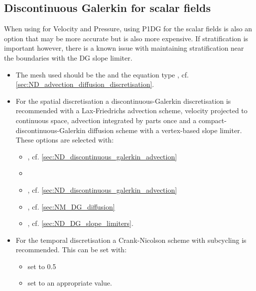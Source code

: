 \subsection{Discontinuous Galerkin for scalar fields}
When using \PoDGPt for Velocity and Pressure, using P1DG for the scalar fields
is also an option that may be more accurate but is also more expensive. If stratification is important however, there is a known
issue with maintaining stratification near the boundaries with the DG slope
limiter.
\begin{itemize}
  \item The mesh used should be the  and the equation type , cf. \ref{sec:ND_advection_diffusion_discretisation}. 
  \item For the spatial discretisation a discontinuous-Galerkin discretisation
is recommended with a Lax-Friedrichs advection scheme, velocity
projected to continuous space, advection integrated by parts once and
a compact-discontinuous-Galerkin diffusion scheme with a vertex-based
slope limiter. These options are selected with:
\begin{itemize}
\item{, cf. \ref{sec:ND_discontinuous_galerkin_advection}}
\item{}
\item{, cf. \ref{sec:ND_discontinuous_galerkin_advection}}
\item{, cf. \ref{sec:NM_DG_diffusion}}
\item{, cf. \ref{sec:ND_DG_slope_limiters}.}
\end{itemize}

\item For the temporal discretisation a Crank-Nicolson scheme with subcycling is recommended. This can be set with:
\begin{itemize}
\item{ set to 0.5}
\item{ set to an appropriate value.}
\end{itemize}
\end{itemize}

